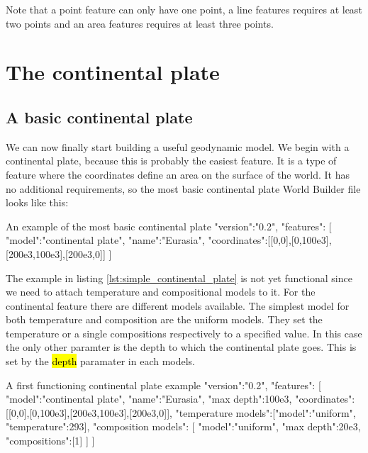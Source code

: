 \documentclass{book}
\newcommand{\WB}{{World Builder}}
\begin{document}
\begin{remark}
Note that a point feature can only have one point, a line features requires at least two points and an area features requires at least three points.
\end{remark}

\section{The continental plate}
\label{section:continetnal_plate}
\subsection{A basic continental plate}
We can now finally start building a useful geodynamic model. We begin with a continental plate, because this is probably the easiest feature. It is a type of feature where the coordinates define an area on the surface of the world. It has no additional requirements, so the most basic continental plate \WB{} file looks like this:

\begin{javascriptcode}[label=lst:simple_continental_plate]{An example of the most basic continental plate}{}
{
  "version":"0.2",
  "features":
  [
    {
      "model":"continental plate", "name":"Eurasia",
      "coordinates":[[0,0],[0,100e3],[200e3,100e3],[200e3,0]]
    }
  ]
}
\end{javascriptcode}

The example in listing \ref{lst:simple_continental_plate} is not yet functional since we need to attach temperature and compositional models to it. For the continental feature there are different models available. The simplest model for both temperature and composition are the uniform models. They set the temperature or a single compositions respectively to a specified value. In this case the only other paramter is the depth to which the continental plate goes. This is set by the \hl{depth} paramater in each models.

\begin{javascriptcode}{A first functioning continental plate example}{}
{
  "version":"0.2",
  "features":
  [
    {
      "model":"continental plate", "name":"Eurasia", "max depth":100e3,
      "coordinates":[[0,0],[0,100e3],[200e3,100e3],[200e3,0]],
      "temperature models":[{"model":"uniform", "temperature":293}],
      "composition models":
      [
        {"model":"uniform", "max depth":20e3, "compositions":[1]}
      ]
    }
  ]
}
\end{javascriptcode}
\end{document}
